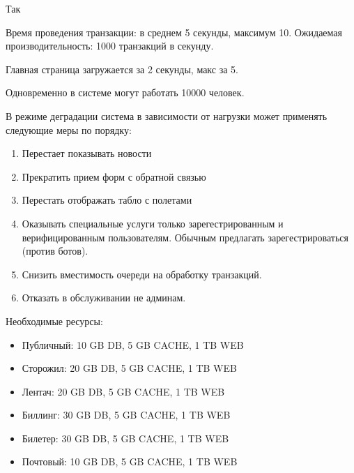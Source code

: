 Так

Время проведения транзакции: в среднем 5 секунды, максимум 10.
Ожидаемая производительность: 1000 транзакций в секунду.

Главная страница загружается за 2 секунды, макс за 5.

Одновременно в системе могут работать 10000 человек.

В режиме деградации система в зависимости от нагрузки
может применять следующие меры по порядку:
\begin{enumerate}
    \item Перестает показывать новости
    \item Прекратить прием форм с обратной связью
    \item Перестать отображать табло с полетами
    \item Оказывать специальные услуги только 
          зарегестрированным и верифицированным 
          пользователям. Обычным предлагать 
          зарегестрироваться (против ботов).
    \item Снизить вместимость очереди на обработку 
          транзакций.
    \item Отказать в обслуживании не админам.
\end{enumerate}

Необходимые ресурсы:
\begin{itemize}
    \item Публичный: 10 GB DB, 5 GB CACHE, 1 TB WEB
    \item Сторожил: 20 GB DB, 5 GB CACHE, 1 TB WEB
    \item Лентач: 20 GB DB, 5 GB CACHE, 1 TB WEB
    \item Биллинг: 30 GB DB, 5 GB CACHE, 1 TB WEB
    \item Билетер: 30 GB DB, 5 GB CACHE, 1 TB WEB
    \item Почтовый: 10 GB DB, 5 GB CACHE, 1 TB WEB
\end{itemize}
